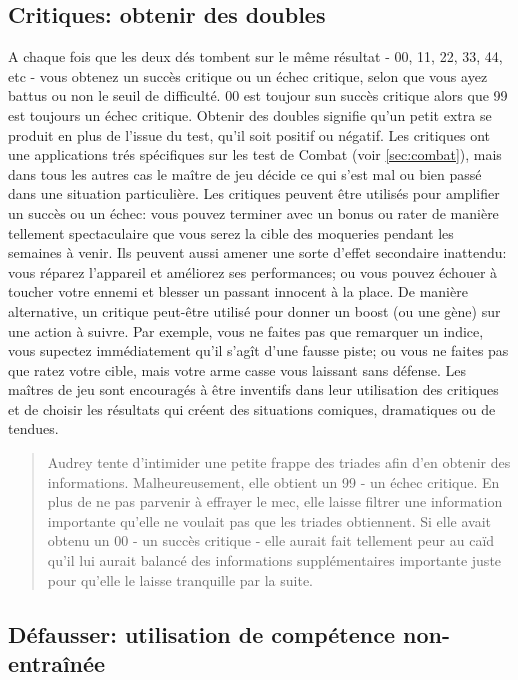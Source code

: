 \subsection{Critiques: obtenir des doubles} \label{sec:crit-roll-doubl} 

A chaque fois que les deux dés tombent sur le même résultat - 00, 11, 22, 33, 44, etc - vous obtenez un succès critique ou un échec critique, selon que vous ayez battus ou non le seuil de difficulté. 00 est toujour sun succès critique alors que 99 est toujours un échec critique. Obtenir des doubles signifie qu'un petit extra se produit en plus de l'issue du test, qu'il soit positif ou négatif. Les critiques ont une applications trés spécifiques sur les test de Combat (voir \ref{sec:combat}), mais dans tous les autres cas le maître de jeu décide ce qui s'est mal ou bien passé dans une situation particulière. Les critiques peuvent être utilisés pour amplifier un succès ou un échec: vous pouvez terminer avec un bonus ou rater de manière tellement spectaculaire que vous serez la cible des moqueries pendant les semaines à venir. Ils peuvent aussi amener une sorte d'effet secondaire inattendu: vous réparez l'appareil et améliorez ses performances; ou vous pouvez échouer à toucher votre ennemi et blesser un passant innocent à la place. De manière alternative, un critique peut-être utilisé pour donner un boost (ou une gène) sur une action à suivre. Par exemple, vous ne faites pas que remarquer un indice, vous supectez immédiatement qu'il s'agît d'une fausse piste; ou vous ne faites pas que ratez votre cible, mais votre arme casse vous laissant sans défense. Les maîtres de jeu sont encouragés à être inventifs dans leur utilisation des critiques et de choisir les résultats qui créent des situations comiques, dramatiques ou de tendues. 

\begin{quotation} Audrey tente d'intimider une petite frappe des triades afin d'en obtenir des informations. Malheureusement, elle obtient un 99 - un échec critique. En plus de ne pas parvenir à effrayer le mec, elle laisse filtrer une information importante qu'elle ne voulait pas que les triades obtiennent. Si elle avait obtenu un 00 - un succès critique - elle aurait fait tellement peur au caïd qu'il lui aurait balancé des informations supplémentaires importante juste pour qu'elle le laisse tranquille par la suite. \end{quotation} 

\subsection{Défausser: utilisation de compétence non-entraînée} \label{sec:defa-untr-skill} 

